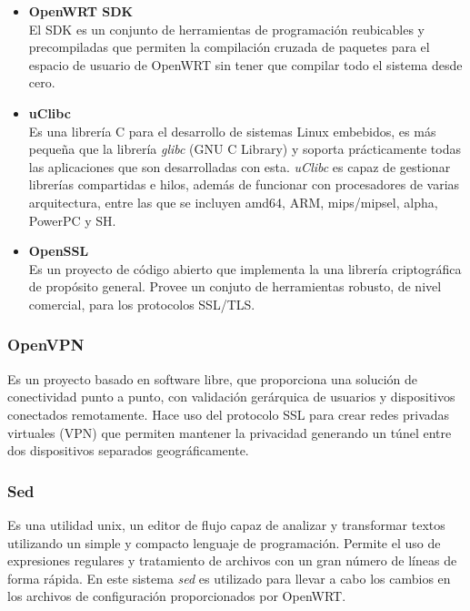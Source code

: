 \documentclass[12pt, twoside]{article}
\begin{document}
            \begin{itemize}
                \item \textbf{OpenWRT SDK} \\
                El SDK es un conjunto de herramientas de programación reubicables y precompiladas que permiten la compilación cruzada de paquetes para el espacio de usuario de OpenWRT sin tener que compilar todo el sistema desde cero.

                \item \textbf{uClibc} \\
                    Es una librería C para el desarrollo de sistemas Linux embebidos, es más pequeña que la librería \textit{glibc} (GNU C Library) y soporta prácticamente todas las aplicaciones que son desarrolladas con esta. \textit{uClibc} es capaz de gestionar librerías compartidas e hilos, además de funcionar con procesadores de varias arquitectura, entre las que se incluyen amd64, ARM, mips/mipsel, alpha, PowerPC y SH.

                \item \textbf{OpenSSL} \\
                    Es un proyecto de código abierto que implementa la una librería criptográfica de propósito general. Provee un conjuto de herramientas robusto, de nivel comercial, para los protocolos SSL/TLS.
            \end{itemize}
            
        \subsubsection{OpenVPN}
            Es un proyecto basado en software libre, que proporciona una solución de conectividad punto a punto, con validación gerárquica de usuarios y dispositivos conectados remotamente. Hace uso del protocolo SSL para crear redes privadas virtuales (VPN) que permiten mantener la privacidad generando un túnel entre dos dispositivos separados geográficamente.

        \subsubsection{Sed}
            Es una utilidad unix, un editor de flujo capaz de analizar y transformar textos utilizando un simple y compacto lenguaje de programación. Permite el uso de expresiones regulares y tratamiento de archivos con un gran número de líneas de forma rápida. En este sistema \textit{sed} es utilizado para llevar a cabo los cambios en los archivos de configuración proporcionados por OpenWRT.
\end{document}
